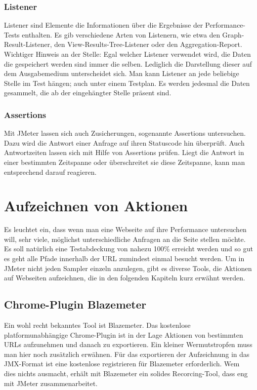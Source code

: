 \documentclass[a4paper,12pt]{article}
\begin{document}
\subsubsection{Listener}
Listener sind Elemente die Informationen über die Ergebnisse der Performance-Tests enthalten. Es gib verschiedene Arten von Listenern, wie etwa den Graph-Result-Listener, den View-Results-Tree-Listener oder den Aggregation-Report. Wichtiger Hinweis an der Stelle: Egal welcher Listener verwendet wird, die Daten die gespeichert werden sind immer die selben. Lediglich die Darstellung dieser auf dem Ausgabemedium unterscheidet sich. Man kann Listener an jede beliebige Stelle im Test hängen; auch unter einem Testplan. Es werden jedesmal die Daten gesammelt, die ab der eingehängter Stelle präsent sind.

\subsubsection{Assertions}
Mit JMeter lassen sich auch Zusicherungen, sogenannte Assertions untersuchen. Dazu wird die Antwort einer Anfrage auf ihren Statuscode hin überprüft. Auch Antwortzeiten lassen sich mit Hilfe von Assertions prüfen. Liegt die Antwort in einer bestimmten Zeitspanne oder überschreitet sie diese Zeitspanne, kann man entsprechend darauf reagieren.  

\section{Aufzeichnen von Aktionen}
Es leuchtet ein, dass wenn man eine Webseite auf ihre Performance untersuchen will, sehr viele, möglichst unterschiedliche Anfragen an die Seite stellen möchte. Es soll natürlich eine Testabdeckung von nahezu 100\% erreicht werden und so gut es geht alle Pfade innerhalb der URL zumindest einmal besucht werden. Um in JMeter nicht jeden Sampler einzeln anzulegen, gibt es diverse Tools, die Aktionen auf Webseiten aufzeichnen, die in den folgenden Kapiteln kurz erwähnt werden.  

\subsection{Chrome-Plugin Blazemeter}
Ein wohl recht bekanntes Tool ist Blazemeter. Das kostenlose platformunabhängige Chrome-Plugin ist in der Lage Aktionen von bestimmten URLs aufzunehmen und danach zu exportieren. Ein kleiner Wermutstropfen muss man hier noch zusätzlich erwähnen. Für das exportieren der Aufzeichnung in das JMX-Format ist eine kostenlose registrieren für Blazemeter erforderlich. Wem dies nichts ausmacht, erhält mit Blazemeter ein solides Recorcing-Tool, dass eng mit JMeter zusammenarbeitet. 
\end{document}
